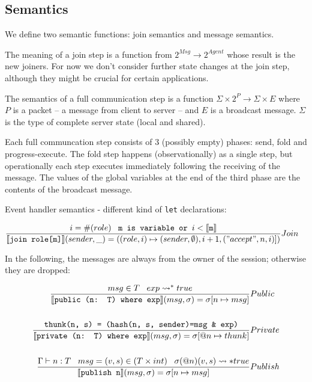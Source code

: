 \documentclass[acmsmall,review,anonymous]{acmart}\settopmatter{printfolios=true}
\begin{document}
\subsection{Semantics}

We define two semantic functions: join semantics and message semantics.

The meaning of a join step is a function from $2^{Msg} \rightarrow 2^{Agent}$ whose result is the new joiners.
For now we don't consider further state changes at the join step, although they might be crucial for certain applications.

The semantics of a full communication step is a function $\Sigma \times 2^{P} \rightarrow \Sigma \times E $ where $P$ is a packet -- a message from 
client to server -- and $E$ is a broadcast message. $\Sigma$ is the type of complete server state (local and shared).

Each full communcation step consists of 3 (possibly empty) phases: send, fold and progress-execute.
The fold step happens (observationally) as a single step, but operationally each step executes immediately following the receiving of the message.
The values of the global variables at the end of the third phase are the contents of the broadcast message.

Event handler semantics - different kind of \texttt{let} declarations:

\newcommand{\owner}{\mathbb{R}}
\begin{align*}
	\judge{&Join}{
		i = \#(role) \;\;\; \texttt{m is variable or } i < \semfunc[m]
	}{
		\semfunc[{join role[m]}](sender, \_) = ((role, i) \mapsto (sender, \emptyset), i+1, ("accept", n, i)])
	}
\end{align*}

In the following, the messages are always from the owner of the session; otherwise they are dropped:

\begin{align*}
	\judge{&Public}{
		msg \in T \; \; \; exp \leadsto^* true
	}{
		\semfunc[public (n: T) where exp](msg, \sigma) = \sigma [n \mapsto msg]
	}\\	\\
	\judge{&Private}{
		\texttt{thunk(n, s) = (hash(n, s, sender)=msg \& exp)}
	}{
		\semfunc[private (n: T) where exp](msg, \sigma) = \sigma [@n \mapsto thunk]
	}\\	\\
	\judge{&Publish}{
		\Gamma \vdash n : T \;\;\; msg = (v, s) \in (T \times int) \;\;\; \sigma(@n)(v, s) \leadsto* true
	}{
		\semfunc[publish n](msg, \sigma) = \sigma [n \mapsto msg]
	}
\end{align*}
\end{document}
